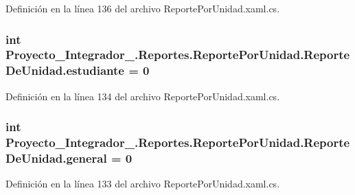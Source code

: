 Definición en la línea 136 del archivo Reporte\-Por\-Unidad.\-xaml.\-cs.

\hypertarget{class_proyecto___integrador__3_1_1_reportes_1_1_reporte_por_unidad_1_1_reporte_de_unidad_a1f6de144584bd3705d824d4f06dd6cf0}{
\subsubsection[{estudiante}]{\setlength{\rightskip}{0pt plus 5cm}int Proyecto\-\_\-\-Integrador\-\_.\-Reportes.\-Reporte\-Por\-Unidad.\-Reporte\-De\-Unidad.\-estudiante = 0\hspace{0.3cm}{\ttfamily [private]}}}\label{class_proyecto___integrador__3_1_1_reportes_1_1_reporte_por_unidad_1_1_reporte_de_unidad_a1f6de144584bd3705d824d4f06dd6cf0}


Definición en la línea 134 del archivo Reporte\-Por\-Unidad.\-xaml.\-cs.

\hypertarget{class_proyecto___integrador__3_1_1_reportes_1_1_reporte_por_unidad_1_1_reporte_de_unidad_a9e0e8780e5b3f5f6d09c96c104732388}{
\subsubsection[{general}]{\setlength{\rightskip}{0pt plus 5cm}int Proyecto\-\_\-\-Integrador\-\_.\-Reportes.\-Reporte\-Por\-Unidad.\-Reporte\-De\-Unidad.\-general = 0\hspace{0.3cm}{\ttfamily [private]}}}\label{class_proyecto___integrador__3_1_1_reportes_1_1_reporte_por_unidad_1_1_reporte_de_unidad_a9e0e8780e5b3f5f6d09c96c104732388}


Definición en la línea 133 del archivo Reporte\-Por\-Unidad.\-xaml.\-cs.

